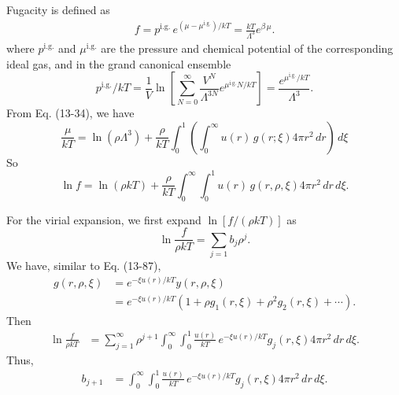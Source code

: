 \documentclass[twocolumn, 10pt]{article}
\numberwithin{equation}{section}
\newenvironment{solution}[1][\empty]
{\par\medskip
  \textbf{\ifx\empty#1{Solution.}\relax\else{#1}\fi} \ignorespaces}
{\medskip}
\begin{document}
\begin{solution}
  Fugacity is defined as
  \begin{align*}
    f = p^\mathrm{i.g.} \, e^{(\mu - \mu^\mathrm{i.g.})/kT}
      = \frac{ k T } { \Lambda^3 } e^{\beta \, \mu}.
  \end{align*}
  where $p^\mathrm{i.g.}$ and $\mu^\mathrm{i.g.}$
  are the pressure and chemical potential of
  the corresponding ideal gas, and
  in the grand canonical ensemble
  $$
  p^\mathrm{i.g.}/kT
  = \frac{1}{V} \ln \left[
    \sum_{N=0}^\infty \frac{V^N}{\Lambda^{3N}}e^{\mu^\mathrm{i.g.} N/kT}
    \right]
  = \frac{ e^{\mu^\mathrm{i.g.}/kT} }{ \Lambda^3 }.
  $$
  From Eq. (13-34), we have
  \begin{equation}
    \frac{\mu}{kT}
    =
    \ln(\rho\Lambda^3)
    +
    \frac{\rho}{kT}
    \int_0^1
    \left( \int_0^\infty
    u(r) \, g(r; \xi) 4 \pi r^2 \, dr \right) \, d\xi
    \tag{13-34}
  \end{equation}
  So
  \begin{equation*}
    \ln f
    =
    \ln(\rho kT)
    +
    \frac{\rho}{kT}
    \int_0^\infty
    \int_0^1
    u(r) \, g(r, \rho, \xi) 4 \pi r^2 \, dr \, d\xi.
  \end{equation*}

  For the virial expansion, we first expand $\ln[f/(\rho kT)]$ as
  $$
  \ln \frac{ f }{ \rho k T} = \sum_{j=1} b_j \rho^j.
  $$
  We have, similar to Eq. (13-87),
  \begin{align*}
  g(r, \rho, \xi)
    &=
    e^{-\xi u(r)/kT}
    y(r, \rho, \xi)
    \\
    &=
    e^{-\xi u(r)/kT}
    \left(
    1 + \rho g_1(r, \xi)
    + \rho^2 g_2(r, \xi) + \cdots
    \right)
    .
  \end{align*}
  Then
  \begin{align*}
    \ln \frac{ f } { \rho k T }
    &=
    \sum_{j=1}^\infty
    \rho^{j+1}
    \int_0^\infty
    \int_0^1
    \frac{u(r)} {kT} \, e^{-\xi u(r)/kT}
    g_j(r, \xi) 4 \pi r^2 \, dr \, d\xi.
  \end{align*}
  Thus,
  \begin{align*}
    b_{j+1}
    &=
    \int_0^\infty
    \int_0^1
    \frac{u(r)} {kT} \, e^{-\xi u(r)/kT}
    g_j(r, \xi) 4 \pi r^2 \, dr \, d\xi
    .
  \end{align*}


\end{solution}
\end{document}
